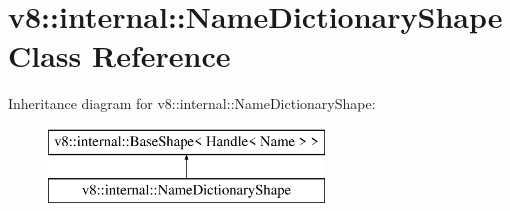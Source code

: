 \hypertarget{classv8_1_1internal_1_1_name_dictionary_shape}{}\section{v8\+:\+:internal\+:\+:Name\+Dictionary\+Shape Class Reference}
\label{classv8_1_1internal_1_1_name_dictionary_shape}
Inheritance diagram for v8\+:\+:internal\+:\+:Name\+Dictionary\+Shape\+:\begin{figure}[H]
\begin{center}
\leavevmode
\includegraphics[height=2.000000cm]{classv8_1_1internal_1_1_name_dictionary_shape}
\end{center}
\end{figure}
